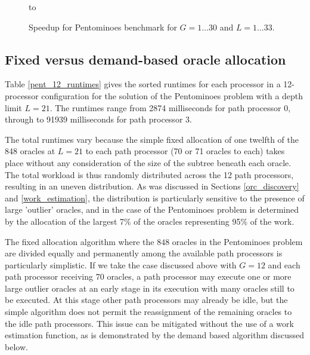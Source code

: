 \begin{figure}[htb]
\vspace{5mm} \hbox to 
\caption{Speedup for Pentominoes benchmark for $G=1\ldots 30$ and $L=1\ldots 33$.}
\vspace{5mm}
\label{pent_3d}
\end{figure}

\subsection{Fixed versus demand-based oracle allocation}
\label{demand_alloc}

Table \ref{pent_12_runtimes} gives the sorted runtimes for each processor in a
12-processor configuration for the solution of the Pentominoes problem with
a depth limit $L=21$.  The runtimes range from 2874 milliseconds for
path processor 0, through to 91939 milliseconds for path processor 3.

The total runtimes vary because the simple fixed allocation of one twelfth of the
848 oracles at $L=21$ to each path processor (70 or 71 oracles to each) takes place
without any consideration of the size of the subtree beneath each oracle.  The total
workload is thus randomly distributed across the 12 path processors, resulting in an
uneven distribution.  As was discussed in Sections \ref{orc_discovery} and
\ref{work_estimation}, the distribution
is particularly sensitive to the presence of large 'outlier' oracles, and in the
case of the Pentominoes problem is determined by the allocation of the largest 7\% of
the oracles representing 95\% of the work.

The fixed allocation algorithm where the $848$ oracles in the Pentominoes problem are
divided equally and permanently among the available path processors is particularly
simplistic.  If we take the case discussed above with $G=12$ and each path processor
receiving $70$ oracles, a path processor may execute one or more large outlier oracles
at an early stage in its execution with many oracles still to be executed. At this stage
other path processors may already be idle, but the simple algorithm does not permit the
reassignment of the remaining oracles to the idle path processors.  This issue can be
mitigated without the use of a work estimation function, as is demonstrated by the
demand based algorithm discussed below.

